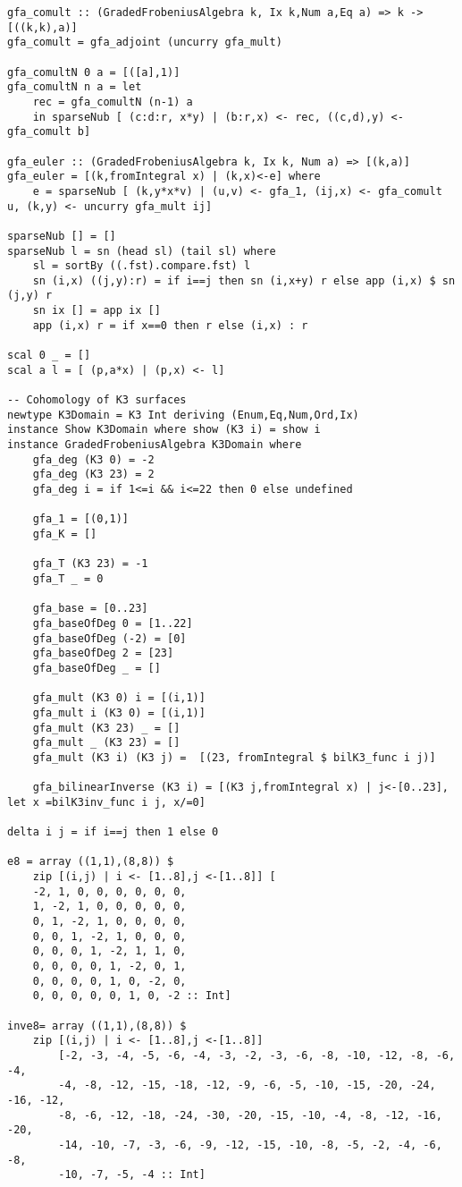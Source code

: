\begin{lstlisting}
gfa_comult :: (GradedFrobeniusAlgebra k, Ix k,Num a,Eq a) => k -> [((k,k),a)]
gfa_comult = gfa_adjoint (uncurry gfa_mult)

gfa_comultN 0 a = [([a],1)]
gfa_comultN n a = let
	rec = gfa_comultN (n-1) a
	in sparseNub [ (c:d:r, x*y) | (b:r,x) <- rec, ((c,d),y) <- gfa_comult b]

gfa_euler :: (GradedFrobeniusAlgebra k, Ix k, Num a) => [(k,a)]
gfa_euler = [(k,fromIntegral x) | (k,x)<-e] where 
	e = sparseNub [ (k,y*x*v) | (u,v) <- gfa_1, (ij,x) <- gfa_comult u, (k,y) <- uncurry gfa_mult ij] 

sparseNub [] = []
sparseNub l = sn (head sl) (tail sl) where
	sl = sortBy ((.fst).compare.fst) l
	sn (i,x) ((j,y):r) = if i==j then sn (i,x+y) r else app (i,x) $ sn (j,y) r
	sn ix [] = app ix []
	app (i,x) r = if x==0 then r else (i,x) : r

scal 0 _ = []
scal a l = [ (p,a*x) | (p,x) <- l]

-- Cohomology of K3 surfaces
newtype K3Domain = K3 Int deriving (Enum,Eq,Num,Ord,Ix)
instance Show K3Domain where show (K3 i) = show i
instance GradedFrobeniusAlgebra K3Domain where
	gfa_deg (K3 0) = -2
	gfa_deg (K3 23) = 2
	gfa_deg i = if 1<=i && i<=22 then 0 else undefined
	
	gfa_1 = [(0,1)]
	gfa_K = []
	
	gfa_T (K3 23) = -1
	gfa_T _ = 0
	
	gfa_base = [0..23]
	gfa_baseOfDeg 0 = [1..22]
	gfa_baseOfDeg (-2) = [0]
	gfa_baseOfDeg 2 = [23]
	gfa_baseOfDeg _ = []
	
	gfa_mult (K3 0) i = [(i,1)]
	gfa_mult i (K3 0) = [(i,1)]
	gfa_mult (K3 23) _ = []
	gfa_mult _ (K3 23) = []
	gfa_mult (K3 i) (K3 j) =  [(23, fromIntegral $ bilK3_func i j)]
	
	gfa_bilinearInverse (K3 i) = [(K3 j,fromIntegral x) | j<-[0..23], let x =bilK3inv_func i j, x/=0]

delta i j = if i==j then 1 else 0

e8 = array ((1,1),(8,8)) $
	zip [(i,j) | i <- [1..8],j <-[1..8]] [
	-2, 1, 0, 0, 0, 0, 0, 0,
	1, -2, 1, 0, 0, 0, 0, 0,
	0, 1, -2, 1, 0, 0, 0, 0,
	0, 0, 1, -2, 1, 0, 0, 0,
	0, 0, 0, 1, -2, 1, 1, 0,
	0, 0, 0, 0, 1, -2, 0, 1,
	0, 0, 0, 0, 1, 0, -2, 0,
	0, 0, 0, 0, 0, 1, 0, -2 :: Int]

inve8= array ((1,1),(8,8)) $
	zip [(i,j) | i <- [1..8],j <-[1..8]] 
	    [-2, -3, -4, -5, -6, -4, -3, -2, -3, -6, -8, -10, -12, -8, -6, -4,
		-4, -8, -12, -15, -18, -12, -9, -6, -5, -10, -15, -20, -24, -16, -12,
		-8, -6, -12, -18, -24, -30, -20, -15, -10, -4, -8, -12, -16, -20,
		-14, -10, -7, -3, -6, -9, -12, -15, -10, -8, -5, -2, -4, -6, -8,
		-10, -7, -5, -4 :: Int]


\end{lstlisting}
